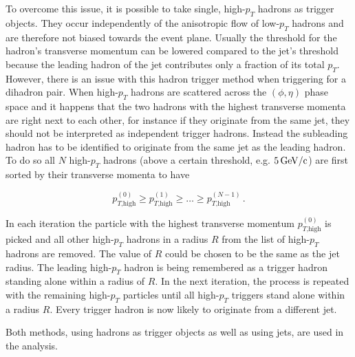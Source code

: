 \documentclass[
  a4paper,
  12pt,
  oneside,
  parskip=half,
  listof=totoc,
  bibliography=totoc,
  DIV=12,
  numbers=noenddot,
  BA.tex
  ]{subfiles}
\begin{document}
To overcome this issue, it is possible to take single, high-$p_T$ hadrons as trigger objects. They occur independently of the anisotropic flow of low-$p_T$ hadrons and are therefore not biased towards the event plane. Usually the threshold for the hadron's transverse momentum can be lowered compared to the jet's threshold because the leading hadron of the jet contributes only a fraction of its total $p_T$. However, there is an issue with this hadron trigger method when triggering for a dihadron pair. When high-$p_T$ hadrons are scattered across the $(\phi, \eta)$ phase space and it happens that the two hadrons with the highest transverse momenta are right next to each other, for instance if they originate from the same jet, they should not be interpreted as independent trigger hadrons. Instead the subleading hadron has to be identified to originate from the same jet as the leading hadron. To do so all $N$ high-$p_T$ hadrons (above a certain threshold, e.g. $5\bunit{GeV/c}$) are first sorted by their transverse momenta to have 

\begin{equation}
	p_{T\text{,high}}^{(0)} \geq p_{T\text{,high}}^{(1)} \geq \dots \geq p_{T\text{,high}}^{(N-1)} \, .
\end{equation} 

In each iteration the particle with the highest transverse momentum $p_{T\text{,high}}^{(0)}$ is picked and all other high-$p_T$ hadrons in a radius $R$ from the list of high-$p_T$ hadrons are removed. The value of $R$ could be chosen to be the same as the jet radius. The leading high-$p_T$ hadron is being remembered as a trigger hadron standing alone within a radius of $R$. In the next iteration, the process is repeated with the remaining high-$p_T$ particles until all high-$p_T$ triggers stand alone within a radius $R$. Every trigger hadron is now likely to originate from a different jet.

Both methods, using hadrons as trigger objects as well as using jets, are used in the analysis.
\end{document}
